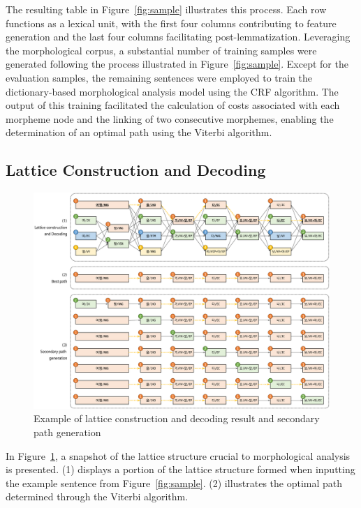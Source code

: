 \documentclass[AMS,STIX2COL]{WileyNJD-v2}
\begin{document}
    The resulting table in Figure~\ref{fig:sample} illustrates this process.
    Each row functions as a lexical unit, with the first four columns contributing to feature generation and the last four columns facilitating post-lemmatization.
    Leveraging the morphological corpus, a substantial number of training samples were generated following the process illustrated in Figure~\ref{fig:sample}.
    Except for the evaluation samples, the remaining sentences were employed to train the dictionary-based morphological analysis model using the CRF algorithm.
    The output of this training facilitated the calculation of costs associated with each morpheme node and the linking of two consecutive morphemes, enabling the determination of an optimal path using the Viterbi algorithm.

    \subsection{Lattice Construction and Decoding}\label{subsec:lattice-construction-and-decoding}

    \begin{figure}[h]
        \centerline{\includegraphics[width=1.0\textwidth]{fig;lattice-v3}}
        \caption{Example of lattice construction and decoding result and secondary path generation}
        \label{fig:lattice}
    \end{figure}

    In Figure~\ref{fig:lattice}, a snapshot of the lattice structure crucial to morphological analysis is presented.
    (1) displays a portion of the lattice structure formed when inputting the example sentence from Figure~\ref{fig:sample}.
    (2) illustrates the optimal path determined through the Viterbi algorithm.
\end{document}
